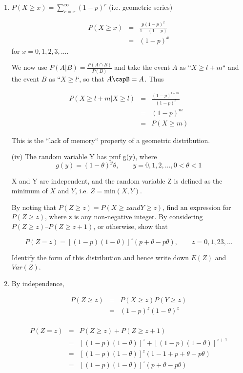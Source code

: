 \documentclass[a4paper,12pt]{article}
\begin{document}
\begin{enumerate}
\item  

$P(X \geq x) = \sum^{\infty}_{r=x}(1-p)^r$ (i.e. geometric series)

\begin{eqnarray*}
P(X \geq x) &=& \frac{p(1-p)^x}{1-(1-p)}\\
&=& (1-p)^x
\end{eqnarray*}
for $x=0,1,2,3,\ldots$.

We now use ${ \displaystyle P(A|B) = \frac{P(A \cap B)}{P(B)}  }$
and take the event $A$ as ``$X \geq l+m$`` and
the event $B$ as ``$X \geq l$`, so that $A \capB = A$.
Thus

\begin{eqnarray*}
P(X \geq l+m|X\geq l) &=& 
\frac{(1-p)^{l+m}}{(1-p)^l}\\
&=&(1-p)^m \\
&=&P(X \geq m)
\end{eqnarray*}

This is the ``lack of memory`` property of a geometric distribution.

\begin{framed}
(iv) The random variable Y has pmf g(y), where
\[ g(y) = (1- \theta)^y \theta, \qquad y={0,1,2,\ldots} , 0 < \theta < 1\]

X and Y are independent, and the random variable Z is defined as the minimum
of $X$ and $Y$, i.e. $Z = \mbox{min}(X, Y)$. 

By noting that $P(Z \geq z) = P(X \geq z and Y \geq z)$,
find an expression for $P(Z \geq z)$, where z is any non-negative integer. By
considering $P(Z \geq z) – P(Z \geq z + 1)$, or otherwise, show that

\[ P(Z = z) = [(1-p)(1-\theta)]^{z}(p+\theta - p\theta),\qquad z = 0,1,23,\ldots\]

Identify the form of this distribution and hence write down $E(Z)$ and $Var(Z)$.

\end{framed}

\item  By independence, 


\begin{eqnarray*}
P(Z \geq z) 
&=& P(X \geq z) P(Y \geq z) \\
&=& (1-p)^z(1-\theta)^z\\
\end{eqnarray*}

\begin{eqnarray*}
P(Z = z) 
&=& P(Z \geq z) + P(Z \geq z+1) \\
&=& [(1-p)(1-\theta)]^z + [(1-p)(1-\theta)]^{z+1}\\
&=& [(1-p)(1-\theta)]^z (1-1+p+\theta - p\theta)\\
&=& [(1-p)(1-\theta)]^z (p+\theta - p\theta)\\
\end{eqnarray*}


\end{enumerate}
\end{document}
